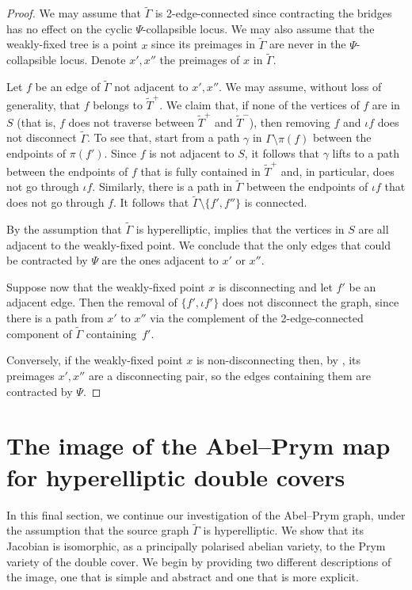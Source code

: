 \documentclass[11pt]{article}
\theoremstyle{definition}
\numberwithin{equation}{section}
\theoremstyle{definition}
\newcommand{\wt}[1]{\widetilde{#1}}
\begin{document}
\begin{proof}

    We may assume that $\wt\Gamma$ is 2-edge-connected since contracting the bridges has no effect on the cyclic $\Psi$-collapsible locus. We may also assume that the weakly-fixed tree is a point $x$ since its preimages in $\wt\Gamma$ are never in the $\Psi$-collapsible locus. Denote $x',x''$ the preimages of $x$ in $\wt\Gamma$. 

Let $f$ be an edge of $\wt\Gamma$ not adjacent to $x',x''$.
We may assume, without loss of generality, that $f$ belongs to $\wt T^+$.
We claim that, if  none of the vertices of $f$ are in $S$ (that is, $f$ does not traverse between $\wt T^+$ and $\wt T^-$), then removing $f$ and $\iota f$ does not disconnect $\wt\Gamma$. To see that, start from a path $\gamma$ in 
$\Gamma\setminus\pi(f)$ between the endpoints of $\pi(f')$. Since $f$ is not adjacent to $S$, it follows that $\gamma$ lifts to a path 
between the endpoints of $f$ that is fully contained in $\wt T^+$ and, in particular, does not go through $\iota f$. Similarly, there is a path in $\wt\Gamma$ between the endpoints of $\iota f$ that does not go through $f$. It follows that  $\wt\Gamma\setminus\{f',f''\}$ is connected.   

By the assumption that $\wt\Gamma$ is hyperelliptic,  implies that the  vertices in $S$ are all adjacent to the weakly-fixed point. We conclude that the only edges that could be contracted by $\Psi$ are the ones adjacent to $x'$ or $x''$. 

Suppose now that the weakly-fixed point $x$ is disconnecting and let $f'$ be an adjacent edge. Then the removal of $\{f',\iota f'\}$ does not disconnect the graph, since  there is a path from $x'$ to $x''$ via the complement of the 2-edge-connected component of $\wt\Gamma$ containing~$f'$. 

Conversely, if the weakly-fixed point $x$ is non-disconnecting then, by , its preimages $x',x''$ are  a disconnecting pair, so the edges containing them are contracted by $\Psi$. 
\end{proof}

\section{The image of the Abel--Prym map for hyperelliptic double covers}
\label{sec:hypcase}


In this final section, we continue our investigation of the  Abel--Prym graph, under the assumption that the source graph $\wt\Gamma$ is hyperelliptic. We show that its Jacobian
is isomorphic, as a principally polarised abelian variety, to the Prym variety of the double cover. 
We begin by providing two different descriptions of the image, one that is simple and abstract and one that is more explicit. 
\end{document}
